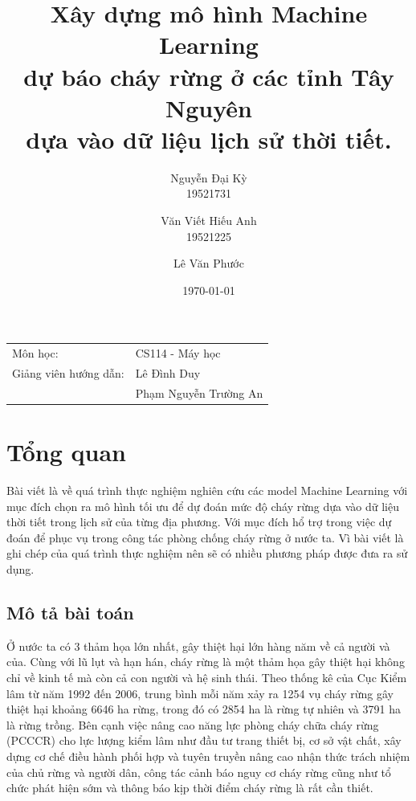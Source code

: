 \documentclass{article}
\begin{document}
\title{
	\LARGE{
		\textbf{
			Xây dựng mô hình Machine Learning \\ dự báo cháy rừng ở các tỉnh Tây Nguyên \\ dựa vào dữ liệu lịch sử thời tiết.
		}
	}
}

\author{
	Nguyễn Đại Kỳ\\
	19521731\\
	\and
	Văn Viết Hiếu Anh\\
	19521225
	\and
	Lê Văn Phước\\

}

\date{\today} %
\maketitle %
\begin{center}
	\begin{tabular}{l l}
		Môn học:              & CS114 - Máy học       \\
		Giảng viên hướng dẫn: & Lê Đình Duy           \\
		                      & Phạm Nguyễn Trường An \\
	\end{tabular}
\end{center}

\tableofcontents

\pagebreak


\section{Tổng quan}
\qquad Bài viết là về quá trình thực nghiệm nghiên cứu các model Machine Learning với mục đích chọn ra mô hình tối ưu để dự đoán mức độ cháy rừng dựa vào dữ liệu thời tiết trong lịch sử của từng địa phương. Với mục đích hổ trợ trong việc dự đoán để phục vụ trong công tác phòng chống cháy rừng ở nước ta. Vì bài viết là ghi chép của quá trình thực nghiệm nên sẽ có nhiều phương pháp được đưa ra sử dụng.

\subsection{Mô tả bài toán}
\qquad Ở nước ta có 3 thảm họa lớn nhất, gây thiệt hại lớn hàng năm về cả người và của. Cùng với lũ lụt và hạn hán, cháy rừng là một thảm họa gây thiệt hại không chỉ về kinh tế mà còn cả con người và hệ sinh thái. Theo thống kê của Cục Kiểm lâm từ năm 1992 đến 2006, trung bình mỗi năm xảy ra 1254 vụ cháy rừng gây thiệt hại khoảng 6646 ha rừng, trong đó có 2854 ha là rừng tự nhiên và 3791 ha là rừng trồng. Bên cạnh việc nâng cao năng lực phòng cháy chữa cháy rừng (PCCCR) cho lực lượng kiểm lâm như đầu tư trang thiết bị, cơ sở vật chất, xây dựng cơ chế điều hành phối hợp và tuyên truyền nâng cao nhận thức trách nhiệm của chủ rừng và người dân, công tác cảnh báo nguy cơ cháy rừng cũng như tổ chức phát hiện sớm và thông báo kịp thời điểm cháy rừng là rất cần thiết.
\end{document}

